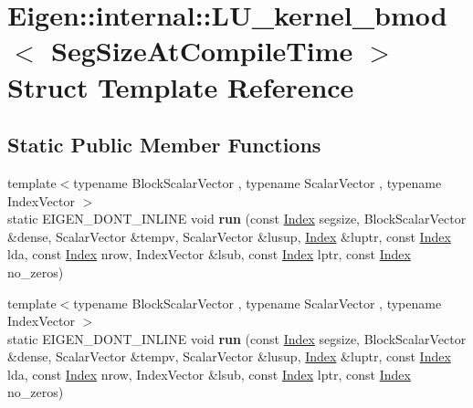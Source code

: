 \hypertarget{struct_eigen_1_1internal_1_1_l_u__kernel__bmod}{}\section{Eigen\+:\+:internal\+:\+:L\+U\+\_\+kernel\+\_\+bmod$<$ Seg\+Size\+At\+Compile\+Time $>$ Struct Template Reference}
\label{struct_eigen_1_1internal_1_1_l_u__kernel__bmod}
\subsection*{Static Public Member Functions}
\begin{DoxyCompactItemize}
\item 
\mbox{\label{struct_eigen_1_1internal_1_1_l_u__kernel__bmod_a475f853efdc24aaca3444da518f40ba8}} 
{\footnotesize template$<$typename Block\+Scalar\+Vector , typename Scalar\+Vector , typename Index\+Vector $>$ }\\static E\+I\+G\+E\+N\+\_\+\+D\+O\+N\+T\+\_\+\+I\+N\+L\+I\+NE void {\bfseries run} (const \hyperlink{namespace_eigen_a62e77e0933482dafde8fe197d9a2cfde}{Index} segsize, Block\+Scalar\+Vector \&dense, Scalar\+Vector \&tempv, Scalar\+Vector \&lusup, \hyperlink{namespace_eigen_a62e77e0933482dafde8fe197d9a2cfde}{Index} \&luptr, const \hyperlink{namespace_eigen_a62e77e0933482dafde8fe197d9a2cfde}{Index} lda, const \hyperlink{namespace_eigen_a62e77e0933482dafde8fe197d9a2cfde}{Index} nrow, Index\+Vector \&lsub, const \hyperlink{namespace_eigen_a62e77e0933482dafde8fe197d9a2cfde}{Index} lptr, const \hyperlink{namespace_eigen_a62e77e0933482dafde8fe197d9a2cfde}{Index} no\+\_\+zeros)
\item 
\mbox{\label{struct_eigen_1_1internal_1_1_l_u__kernel__bmod_a26dd58d182b130a389d7e2de62dd6832}} 
{\footnotesize template$<$typename Block\+Scalar\+Vector , typename Scalar\+Vector , typename Index\+Vector $>$ }\\static E\+I\+G\+E\+N\+\_\+\+D\+O\+N\+T\+\_\+\+I\+N\+L\+I\+NE void {\bfseries run} (const \hyperlink{namespace_eigen_a62e77e0933482dafde8fe197d9a2cfde}{Index} segsize, Block\+Scalar\+Vector \&dense, Scalar\+Vector \&tempv, Scalar\+Vector \&lusup, \hyperlink{namespace_eigen_a62e77e0933482dafde8fe197d9a2cfde}{Index} \&luptr, const \hyperlink{namespace_eigen_a62e77e0933482dafde8fe197d9a2cfde}{Index} lda, const \hyperlink{namespace_eigen_a62e77e0933482dafde8fe197d9a2cfde}{Index} nrow, Index\+Vector \&lsub, const \hyperlink{namespace_eigen_a62e77e0933482dafde8fe197d9a2cfde}{Index} lptr, const \hyperlink{namespace_eigen_a62e77e0933482dafde8fe197d9a2cfde}{Index} no\+\_\+zeros)
\end{DoxyCompactItemize}


